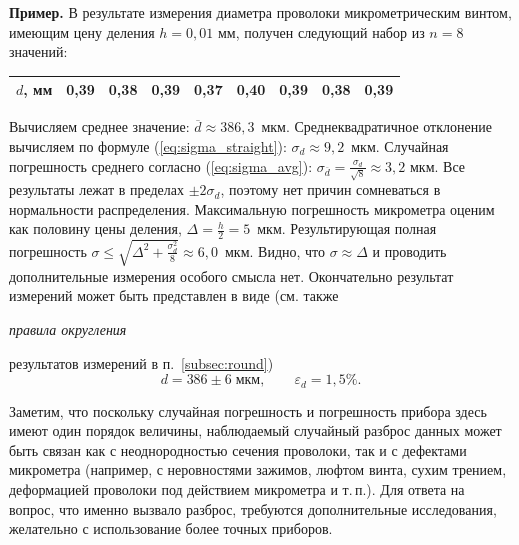 {\footnotesize
\textbf{Пример.} В результате измерения диаметра проволоки микрометрическим винтом,
имеющим цену деления $h=0,01$ мм, получен следующий набор из $n=8$ значений:\par
\begin{tabular}{|c|c|c|c|c|c|c|c|c|}
\hline 
{\footnotesize{}$d$, мм} & {\footnotesize{}0,39} & {\footnotesize{}0,38} & {\footnotesize{}0,39} & {\footnotesize{}0,37} & {\footnotesize{}0,40} & {\footnotesize{}0,39} & {\footnotesize{}0,38} & {\footnotesize{}0,39}\tabularnewline
\hline 
\end{tabular}\par
Вычисляем среднее значение: $\overline{d}\approx386{,}3$~мкм.
Среднеквадратичное отклонение вычисляем по формуле (\ref{eq:sigma_straight}):
$\sigma_{d}\approx9{,}2$~мкм. Случайная погрешность среднего согласно
(\ref{eq:sigma_avg}): $\sigma_{\overline{d}}=\frac{\sigma_{d}}{\sqrt{8}}\approx3{,}2$
мкм. Все результаты лежат в пределах $\pm2\sigma_{d}$, поэтому нет
причин сомневаться в нормальности распределения. Максимальную погрешность
микрометра оценим как половину цены деления, $\Delta=\frac{h}{2}=5$~мкм.
Результирующая полная погрешность $\sigma\le\sqrt{\Delta^{2}+\frac{\sigma_{d}^{2}}{8}}\approx6{,}0$~мкм.
Видно, что $\sigma\approx\Delta$ и проводить дополнительные измерения
особого смысла нет. Окончательно результат измерений может быть представлен
в виде (см. также }\emph{\footnotesize{}правила округления}{\footnotesize{}
результатов измерений в п.~\ref{subsec:round})
\[
d=386\pm6\;\text{мкм},\qquad\varepsilon_{d}=1{,}5\%.
\]

Заметим, что поскольку случайная погрешность и погрешность
прибора здесь имеют один порядок величины, наблюдаемый случайный разброс
данных может быть связан как с неоднородностью сечения проволоки,
так и с дефектами микрометра (например, с неровностями зажимов, люфтом
винта, сухим трением, деформацией проволоки под действием микрометра
и т.\,п.). Для ответа на вопрос, что именно вызвало разброс, требуются
дополнительные исследования, желательно с использование более точных
приборов.\par
}%

